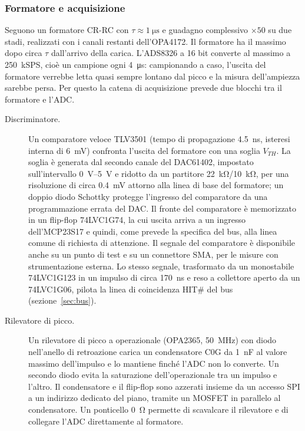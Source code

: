 \documentclass[11pt,a4paper]{article}
\begin{document}
\subsubsection{Formatore e acquisizione}

Seguono un formatore CR-RC con $\tau\approx\SI{1}{\micro\second}$ e guadagno complessivo $\times 50$ su due stadi, realizzati con i canali restanti dell'OPA4172. Il formatore ha il massimo dopo circa $\tau$ dall'arrivo della carica. L'ADS8326 a 16 bit converte al massimo a 250~kSPS, cioè un campione ogni \SI{4}{\micro\second}: campionando a caso, l'uscita del formatore verrebbe letta quasi sempre lontano dal picco e la misura dell'ampiezza sarebbe persa. Per questo la catena di acquisizione prevede due blocchi tra il formatore e l'ADC.

\begin{description}
  \item[Discriminatore.] Un comparatore veloce TLV3501 (tempo di propagazione \SI{4.5}{\nano\second}, isteresi interna di \SI{6}{\milli\volt}) confronta l'uscita del formatore con una soglia $V_{TH}$. La soglia è generata dal secondo canale del DAC61402, impostato sull'intervallo \SIrange{0}{5}{\volt} e ridotto da un partitore \SI{22}{\kilo\ohm}/\SI{10}{\kilo\ohm}, per una risoluzione di circa \SI{0.4}{\milli\volt} attorno alla linea di base del formatore; un doppio diodo Schottky protegge l'ingresso del comparatore da una programmazione errata del DAC. Il fronte del comparatore è memorizzato in un flip-flop 74LVC1G74, la cui uscita arriva a un ingresso dell'MCP23S17 e quindi, come prevede la specifica del bus, alla linea comune di richiesta di attenzione. Il segnale del comparatore è disponibile anche su un punto di test e su un connettore SMA, per le misure con strumentazione esterna. Lo stesso segnale, trasformato da un monostabile 74LVC1G123 in un impulso di circa \SI{170}{\nano\second} e reso a collettore aperto da un 74LVC1G06, pilota la linea di coincidenza HIT\# del bus (sezione~\ref{sec:bus}).
  \item[Rilevatore di picco.] Un rilevatore di picco a operazionale (OPA2365, \SI{50}{\mega\hertz}) con diodo nell'anello di retroazione carica un condensatore C0G da \SI{1}{\nano\farad} al valore massimo dell'impulso e lo mantiene finché l'ADC non lo converte. Un secondo diodo evita la saturazione dell'operazionale tra un impulso e l'altro. Il condensatore e il flip-flop sono azzerati insieme da un accesso SPI a un indirizzo dedicato del piano, tramite un MOSFET in parallelo al condensatore. Un ponticello \SI{0}{\ohm} permette di scavalcare il rilevatore e di collegare l'ADC direttamente al formatore.
\end{description}
\end{document}
